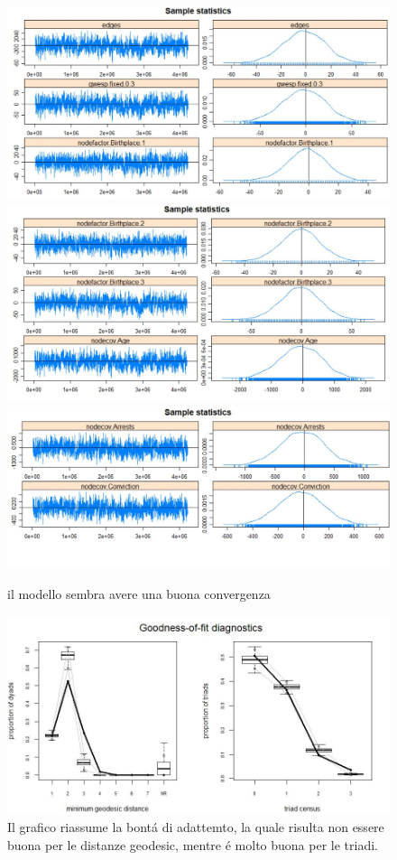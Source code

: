 \documentclass[11pt,a4paper]{report}
\begin{document}
\begin{figure}[H]
	\centering
	\includegraphics[scale=0.45]{mcmc2}
	\includegraphics[scale=0.45]{mcmc3}
	\includegraphics[scale=0.45]{mcmc4}
	\caption{il modello sembra avere una buona convergenza}
\end{figure}

\begin{figure}
	\centering
	\includegraphics{gof}
	\caption{Il grafico riassume la bont\'a di adattemto, la quale risulta non essere buona per le distanze geodesic, mentre \'e molto buona per le triadi.}
\end{figure}
\end{document}
